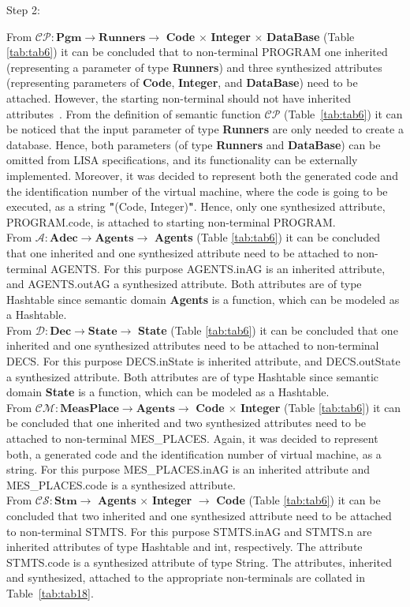 \documentclass[preprint, prX]{revtex4}
\begin{document}
\newpage
Step 2:

From $\mathcal{CP}:\textbf{Pgm} \rightarrow \textbf{Runners} \rightarrow$ \textbf{Code} $\times$ \textbf{Integer} $\times$ \textbf{DataBase}  (Table \ref{tab:tab6}) it can be concluded that to non-terminal PROGRAM one inherited (representing a parameter of type \textbf{Runners}) and three synthesized attributes (representing parameters of \textbf{Code}, \textbf{Integer}, and \textbf{DataBase}) need to be attached. However, the starting non-terminal should not have inherited attributes~\cite{Knuth:1968,Paakki:1995}. From the definition of semantic function $\mathcal{CP}$ (Table~\ref{tab:tab6}) it can be noticed that the input parameter of type \textbf{Runners} are only needed to create a database. Hence, both parameters (of type \textbf{Runners} and \textbf{DataBase}) can be omitted from LISA specifications, and its functionality can be externally implemented. Moreover, it was decided to represent both the generated code and the identification number of the virtual machine, where the code is going to be executed, as a string \textbf{"}(Code, Integer)\textbf{"}. Hence, only one synthesized attribute, PROGRAM.code, is attached to starting non-terminal PROGRAM.\\
From $\mathcal{A}:\textbf{Adec}\rightarrow \textbf{Agents} \rightarrow$ \textbf{Agents} (Table \ref{tab:tab6}) it can be concluded that one inherited and one synthesized attribute need to be attached to non-terminal AGENTS. For this purpose AGENTS.inAG is an inherited attribute, and AGEN\-TS.outAG a synthesized attribute. Both attributes are of type Hashtable since semantic domain \textbf{Agents} is a function, which can be modeled as a Hashtable.\\
From $\mathcal{D}:\textbf{Dec}\rightarrow \textbf{State} \rightarrow$ \textbf{State} (Table \ref{tab:tab6}) it can be concluded that one inherited and one synthesized attributes need to be attached to non-terminal DECS. For this purpose DECS.inState is inherited attribute, and DECS.outState a synthesized attribute. Both attributes are of type Hashtable since semantic domain \textbf{State} is a function, which can be modeled as a Hashtable.\\
From $\mathcal{CM}:\textbf{MeasPlace} \rightarrow \textbf{Agents} \rightarrow$ \textbf{Code} $\times$ \textbf{Integer} (Table \ref{tab:tab6}) it can be concluded that one inherited and two synthesized attributes need to be attached to non-terminal MES\_PLACES. Again, it was decided to represent both, a generated code and the identification number of virtual machine, as a string. For this purpose MES\_\-PLACES.inAG is an inherited attribute and MES\_PLACES.code is a synthesized attribute.\\
From $\mathcal{CS}:\textbf{Stm} \rightarrow$ \textbf{Agents} $\times$ \textbf{Integer} $\rightarrow$ \textbf{Code} (Table \ref{tab:tab6}) it can be concluded that two inherited and one synthesized attribute need to be attached to non-terminal STMTS. For this purpose STMTS.inAG and STMTS.n are inherited attributes of type Hash\-table and int, respectively. The attribute STMTS.code is a synthesized attribute of type String. The attributes, inherited and synthesized, attached to the appropriate non-terminals are collated in Table~\ref{tab:tab18}.
\end{document}
